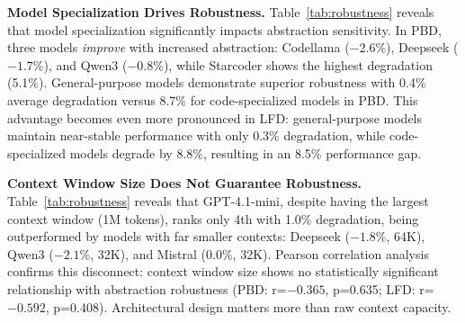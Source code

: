 \documentclass[lettersize,journal]{IEEEtran}
\begin{document}
\textbf{Model Specialization Drives Robustness.} Table~\ref{tab:robustness} reveals that model specialization significantly impacts abstraction sensitivity. In PBD, three models \textit{improve} with increased abstraction: Codellama ($-2.6$\%), Deepseek ($-1.7$\%), and Qwen3 ($-0.8$\%), while Starcoder shows the highest degradation (5.1\%). General-purpose models demonstrate superior robustness with 0.4\% average degradation versus 8.7\% for code-specialized models in PBD. This advantage becomes even more pronounced in LFD: general-purpose models maintain near-stable performance with only 0.3\% degradation, while code-specialized models degrade by 8.8\%, resulting in an 8.5\% performance gap.

\textbf{Context Window Size Does Not Guarantee Robustness.} Table~\ref{tab:robustness} reveals that GPT-4.1-mini, despite having the largest context window (1M tokens), ranks only 4th with 1.0\% degradation, being outperformed by models with far smaller contexts: Deepseek ($-1.8$\%, 64K), Qwen3 ($-2.1$\%, 32K), and Mistral (0.0\%, 32K). Pearson correlation analysis confirms this disconnect: context window size shows no statistically significant relationship with abstraction robustness (PBD: r=$-0.365$, p=0.635; LFD: r=$-0.592$, p=0.408). Architectural design matters more than raw context capacity.

\begin{table}[!t]
    \centering
    \caption{Overall performance by abstraction level: mean accuracy and standard deviation across models.}
    \label{tab:abstraction_overall}
    \scriptsize
    \renewcommand{\arraystretch}{1.2}
\end{table}
\end{document}
